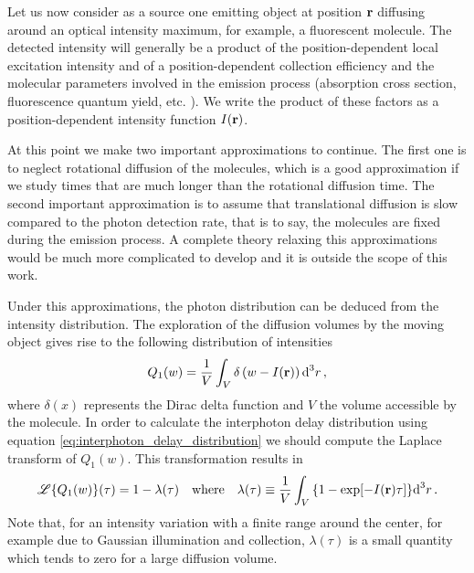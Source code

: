 Let us now consider as a source one emitting object at position ${\mathbf{r}}$ 
diffusing around an optical intensity maximum, for example, a fluorescent molecule. 
The detected intensity will generally be a product of the position-dependent local 
excitation intensity and of a position-dependent collection efficiency and the 
molecular parameters involved in the emission process (absorption cross section, 
fluorescence quantum yield, etc. ). We write the product of these factors as a 
position-dependent intensity function $I({\mathbf{r}})$. 

At this point we make two important approximations to continue. The first one is 
to neglect rotational diffusion of the molecules, which is a good approximation 
if we study times that are much longer than the rotational diffusion time. The 
second important approximation is to assume that translational diffusion is slow
 compared to the photon detection rate, that is to say, the molecules are fixed 
during the emission process. A complete theory relaxing this approximations would 
be much more complicated to develop and it is outside the scope of this work.

Under this approximations, the photon distribution can be deduced from the 
intensity distribution. The exploration of the diffusion volumes by the moving 
object gives rise to the following distribution of intensities 
\begin{equation}
Q_1(w)=\frac{1}{V}\int_V{\delta\left( w-I({\mathbf{r}})\right)\mbox{d}^3r} \,,
\label{eq:intesity1}
\end{equation} 
where $\delta(x)$ represents the Dirac delta function and $V$ the volume 
accessible by the molecule. In order to calculate the interphoton delay 
distribution using equation \ref{eq:interphoton_delay_distribution} we should 
compute the Laplace transform of $Q_1(w)$. This transformation results in 
\begin{equation}
\mathscr{L}\{Q_1(w)\}(\tau) = 1 -\lambda(\tau) \quad \mbox{where} \quad 
\lambda(\tau)\equiv \frac{1}{V}\int_V{ \{1-\exp[-I({\mathbf{r}})\tau]\}\mbox{d}^3r} \, .
\label{eq:one-emitter}
\end{equation} 
Note that, for an intensity variation with a finite range around the center, 
for example due to Gaussian illumination and collection, $\lambda(\tau)$ is a 
small quantity which tends to zero for a large diffusion volume.  

